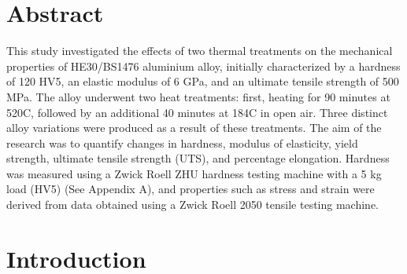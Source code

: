 \documentclass{article}
\begin{document}
    \large\newpage\vspace*{-20pt}

    \section{Abstract}
    \vspace*{1em}
    This study investigated the effects of two thermal treatments on the mechanical properties of HE30/BS1476 aluminium alloy, initially characterized by a hardness of 120 HV5, an elastic modulus of 6 GPa, and an ultimate tensile strength of 500 MPa. The alloy underwent two heat treatments: first, heating for 90 minutes at 520\textdegree C, followed by an additional 40 minutes at 184\textdegree C in open air. Three distinct alloy variations were produced as a result of these treatments. The aim of the research was to quantify changes in hardness, modulus of elasticity, yield strength, ultimate tensile strength (UTS), and percentage elongation. Hardness was measured using a Zwick Roell ZHU hardness testing machine with a 5 kg load (HV5) (See Appendix A), and properties such as stress and strain were derived from data obtained using a Zwick Roell 2050 tensile testing machine.
   
    
    \newpage\vspace*{-20pt}
\section{Introduction}
\end{document}
